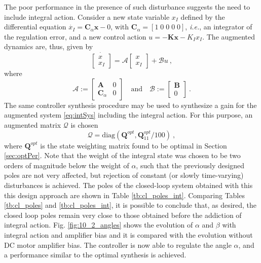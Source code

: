 \documentclass[letterpaper, 10 pt, conference]{ieeeconf}
\begin{document}
The poor performance in the presence of such disturbance suggests the need to include integral action. Consider a new state variable $x_I$ defined by the differential equation $\dot{x_I} = \mathbf{C}_{\alpha}\mathbf{x}-0$, with $\mathbf{C}_{\alpha} = [1\;0\;0\;0\;0]$, \textit{i.e.}, an integrator of the regulation error, and a new control action $u = -\mathbf{Kx}-K_Ix_I$. The augmented dynamics are, thus, given by 
\begin{equation}\label{eq:intSys}
    \dot{\begin{bmatrix}x \\x_I \end{bmatrix}} = \mathcal{A}\begin{bmatrix}x \\x_I\end{bmatrix}+\mathcal{B}u\:,
\end{equation}
where 
\begin{equation*}
    \mathcal{A}:= \begin{bmatrix}\mathbf{A} & 0 \\ \mathbf{C}_{\alpha} & 0 \end{bmatrix} \quad \text{and} \quad \mathcal{B}:= \begin{bmatrix}\mathbf{B} \\ 0 \end{bmatrix}\:.
\end{equation*}
The same controller synthesis procedure may be used to synthesize a gain for the augmented system \eqref{eq:intSys} including the integral action. For this purpose, an augmented matrix $\mathcal{Q}$ is chosen 
\begin{equation*}
    \mathcal{Q} = \mathrm{diag}(\mathbf{Q}^{opt},\mathbf{Q}^{opt}_{11}/100)\:,
\end{equation*}
where $\mathbf{Q}^{opt}$ is the state weighting matrix found to be optimal in Section \ref{sec:optPer}.   
Note that the weight of the integral state was chosen to be two orders of magnitude below the weight of $\alpha$, such that the previously designed poles are not very affected, but rejection of constant (or slowly time-varying) disturbances is achieved. The poles of the closed-loop system obtained with this this design approach are shown in Table \ref{tb:cl_poles_int}. Comparing Tables \ref{tb:cl_poles} and \ref{tb:cl_poles_int}, it is possible to conclude that, as desired, the closed loop poles remain very close to those obtained before the addiction of integral action. Fig. \ref{fig:10_2_angles} shows the evolution of $\alpha$ and $\beta$ with integral action and amplifier bias and it is compared with the evolution without DC motor amplifier bias. The controller is now able to regulate the angle $\alpha$, and a performance similar to the optimal synthesis is achieved. 
\end{document}
